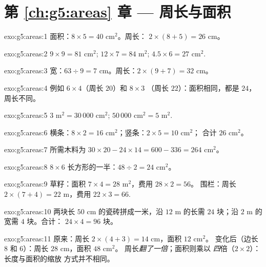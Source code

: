 \section*{第 \ref{ch:g5:areas} 章 --- 周长与面积}

\begin{solution}{exo:g5:areas:1}
面积：$8 \times 5 = 40$ cm$^2$。周长：
$2 \times (8 + 5) = 26$ cm。
\end{solution}

\begin{solution}{exo:g5:areas:2}
$9 \times 9 = 81$ cm$^2$; \quad $12 \times 7 = 84$ m$^2$; \quad
$4.5 \times 6 = 27$ cm$^2$.
\end{solution}

\begin{solution}{exo:g5:areas:3}
宽：$63 \div 9 = 7$ cm。周长：$2 \times (9 + 7) = 32$ cm。
\end{solution}

\begin{solution}{exo:g5:areas:4}
例如 $6 \times 4$（周长 $20$）和 $8 \times 3$
（周长 $22$）：面积相同，都是 $24$，周长不同。
\end{solution}

\begin{solution}{exo:g5:areas:5}
$3$ m$^2 = 30\,000$ cm$^2$; \quad $50\,000$ cm$^2 = 5$ m$^2$.
\end{solution}

\begin{solution}{exo:g5:areas:6}
横条：$8 \times 2 = 16$ cm$^2$；竖条：$2 \times 5 = 10$ cm$^2$；
合计 $26$ cm$^2$。
\end{solution}

\begin{solution}{exo:g5:areas:7}
所需木料为 $30 \times 20 - 24 \times 14 = 600 - 336 = 264$ cm$^2$。
\end{solution}

\begin{solution}{exo:g5:areas:8}
$8 \times 6$ 长方形的一半：$48 \div 2 = 24$ cm$^2$。
\end{solution}

\begin{solution}{exo:g5:areas:9}
草籽：面积 $7 \times 4 = 28$ m$^2$，费用 $28 \times 2 = 56$。
围栏：周长 $2 \times (7 + 4) = 22$ m，费用
$22 \times 3 = 66$.
\end{solution}

\begin{solution}{exo:g5:areas:10}
两块长 $50$ cm 的瓷砖拼成一米，沿 $12$ m 的长需
$24$ 块；沿 $2$ m 的宽需 $4$ 块。合计：
$24 \times 4 = 96$ 块。
\end{solution}

\begin{solution}{exo:g5:areas:11}
原来：周长 $2 \times (4 + 3) = 14$ cm，面积 $12$ cm$^2$。
变化后（边长 $8$ 和 $6$）：周长 $28$ cm，面积 $48$ cm$^2$。
周长\emph{翻了一倍}；面积则乘以
\emph{四}倍（$2 \times 2$）：长度与面积的缩放
方式并不相同。
\end{solution}
